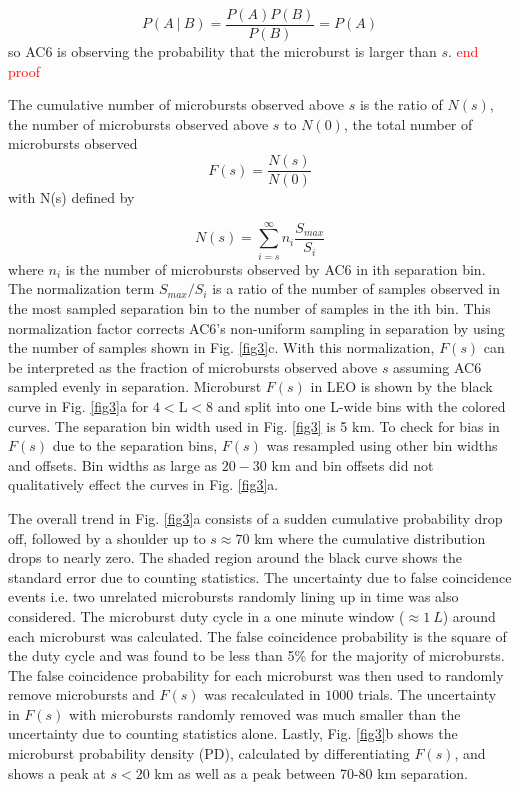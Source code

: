 \documentclass[draft]{agujournal2019}
\begin{document}
\begin{equation}
P(A \ \vert \ B) = \frac{P(A)P(B)}{P(B)} = P(A)
\end{equation} so AC6 is observing the probability that the microburst is larger than $s$. \textcolor{red}{end proof} 
\fi

The cumulative number of microbursts observed above $s$ is the ratio of $N(s)$, the number of microbursts observed above $s$ to $N(0)$, the total number of microbursts observed 
\begin{equation}
F(s) = \frac{N(s)}{N(0)}
\end{equation} with N(s) defined by

\begin{equation}
N(s) = \sum_{i = s}^\infty n_{i} \frac{S_{max}}{S_{i}}
\end{equation} where $n_{i}$ is the number of microbursts observed by AC6 in ith separation bin. The normalization term $S_{max}/S_{i}$ is a ratio of the number of samples observed in the most sampled separation bin to the number of samples in the ith bin. This normalization factor corrects AC6's non-uniform sampling in separation by using the number of samples shown in Fig. \ref{fig3}c. With this normalization, $F(s)$ can be interpreted as the fraction of microbursts observed above $s$ assuming AC6 sampled evenly in separation. Microburst $F(s)$ in LEO is shown by the black curve in Fig. \ref{fig3}a for $4 < \mathrm{L}< 8$ and split into one L-wide bins with the colored curves. The separation bin width used in Fig. \ref{fig3} is 5 km. To check for bias in $F(s)$ due to the separation bins, $F(s)$ was resampled using other bin widths and offsets. Bin widths as large as $20-30$ km and bin offsets did not qualitatively effect the curves in Fig. \ref{fig3}a.

The overall trend in Fig. \ref{fig3}a consists of a sudden cumulative probability drop off, followed by a shoulder up to $s \approx 70$ km where the cumulative distribution drops to nearly zero. The shaded region around the black curve shows the standard error due to counting statistics. The uncertainty due to false coincidence events i.e. two unrelated microbursts randomly lining up in time was also considered. The microburst duty cycle in a one minute window ($\approx 1 \ L$) around each microburst was calculated. The false coincidence probability is the square of the duty cycle and was found to be less than 5\% for the majority of microbursts. The false coincidence probability for each microburst was then used to randomly remove microbursts and $F(s)$ was recalculated in $1000$ trials. The uncertainty in $F(s)$ with microbursts randomly removed was much smaller than the uncertainty due to counting statistics alone. Lastly, Fig. \ref{fig3}b shows the microburst probability density (PD), calculated by differentiating $F(s)$, and shows a peak at $s < 20 $ km as well as a peak between 70-80 km separation. 
\end{document}
